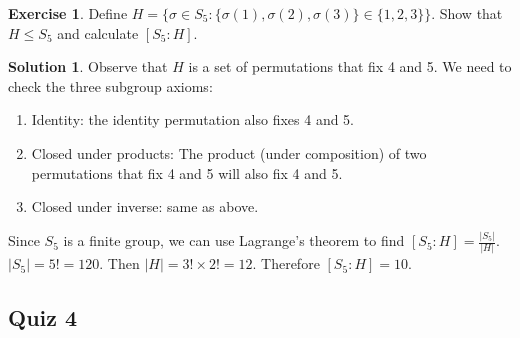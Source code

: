 \documentclass[12pt]{article}
\theoremstyle{definition}
\newtheorem{exercise}{\color{YellowOrange}Exercise}
\theoremstyle{definition}
\newtheorem{solution}{\color{Goldenrod}Solution}
\begin{document}
\begin{exercise}
Define $H = \{\sigma \in S_5 : \{\sigma(1), \sigma(2), \sigma(3) \} \in \{ 1, 2, 3 \} \}$. Show that $H \leq S_5$ and calculate $[S_5 : H]$. 
\end{exercise}
\begin{solution}
Observe that $H$ is a set of permutations that fix 4 and 5. We need to check the three subgroup axioms:
\begin{enumerate}
	\item Identity: the identity permutation also fixes 4 and 5.
	\item Closed under products: The product (under composition) of two permutations that fix 4 and 5 will also fix 4 and 5. 
	\item Closed under inverse: same as above.
\end{enumerate}

Since $S_5$ is a finite group, we can use Lagrange's theorem to find $[S_5 : H] = \frac{|S_5|}{|H|}$.  $|S_5| = 5! = 120$. Then $|H| = 3! \times 2! = 12$. Therefore $[S_5 : H] = 10$.
\end{solution}

\subsection{Quiz 4}
\end{document}
